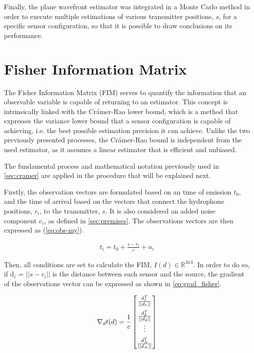 Finally, the plane wavefront estimator was integrated in a Monte Carlo method in order to execute multiple estimations of various transmitter positions, $s$, for a specific sensor configuration, so that it is possible to draw conclusions on its performance.

\section{Fisher Information Matrix} \label{sucsec:FIM}

The Fisher Information Matrix (FIM) serves to quantify the information that an observable variable is capable of returning to an estimator. This concept is intrinsically linked with the Crámer-Rao lower bound, which is a method that expresses the variance lower bound that a sensor configuration is capable of achieving, i.e. the best possible estimation precision it can achieve. Unlike the two previously presented processes, the Crámer-Rao bound is independent from the used estimator, as it assumes a linear estimator that is efficient and unbiased.

The fundamental process and mathematical notation previously used in \ref{sec:cramer} are applied in the procedure that will be explained next.

Firstly, the observation vectors are formulated based on an time of emission $t_0$, and the time of arrival based on the vectors that connect the hydrophone positions, $r_i$, to the transmitter, $s$. It is also considered an added noise component $e_i$, as defined in \ref{sec:premises}. The observations vectors are then expressed as (\ref{eq:obs-my}).

\begin{eqnarray}
	t_i = t_0 + \frac{s - r_i}{c} + n_i 
	\label{eq:obs-my}
\end{eqnarray}

Then, all conditions are set to calculate the FIM,  $I(d) \in \mathbb{R}^{3x3}$. In order to do so, if d$_{i}$ = $|| s - r_{i} ||$ is the distance between each sensor and the source, the gradient of the observations vector can be expressed as shown in \ref{eq:grad_fisher}.

\begin{eqnarray}
	\nabla_{d}t(d) = \frac{1}{c} 
	\begin{bmatrix}
		\frac{d_1^T}{||d_1||} \\ 
		\addlinespace
		\frac{d_2^T}{||d_2||} \\
		\vdots \\
		\addlinespace
		\frac{d_N^T}{||d_N||}
	\end{bmatrix}
	\label{eq:grad_fisher}
\end{eqnarray}

